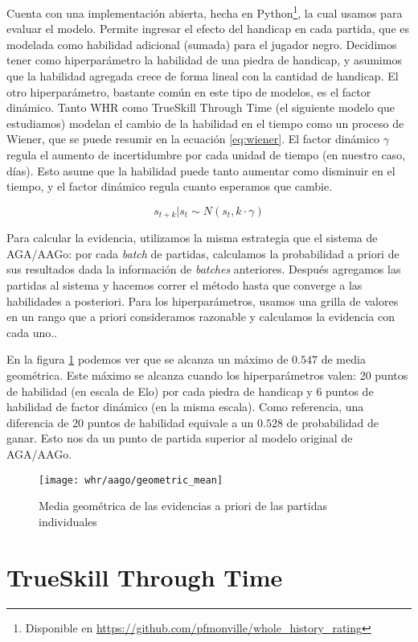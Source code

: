 \documentclass[a4paper,10pt]{report}
\begin{document}
Cuenta con una implementación abierta, hecha en Python\footnote{Disponible en \url{https://github.com/pfmonville/whole_history_rating}}, la cual usamos para evaluar el modelo.
Permite ingresar el efecto del handicap en cada partida, que es modelada como habilidad adicional (sumada) para el jugador negro.
Decidimos tener como hiperparámetro la habilidad de una piedra de handicap, y asumimos que la habilidad agregada crece de forma lineal con la cantidad de handicap.
El otro hiperparámetro, bastante común en este tipo de modelos, es el factor dinámico.
Tanto WHR como TrueSkill Through Time (el siguiente modelo que estudiamos) modelan el cambio de la habilidad en el tiempo como un proceso de Wiener, que se puede resumir en la ecuación \ref{eq:wiener}.
El factor dinámico $\gamma$ regula el aumento de incertidumbre por cada unidad de tiempo (en nuestro caso, días).
Esto asume que la habilidad puede tanto aumentar como disminuir en el tiempo, y el factor dinámico regula cuanto esperamos que cambie.

\begin{equation}\label{eq:wiener}
	s_{t+k} | s_t \sim N(s_t, k \cdot \gamma)
\end{equation}

Para calcular la evidencia, utilizamos la misma estrategia que el sistema de AGA/AAGo: por cada \textit{batch} de partidas, calculamos la probabilidad a priori de sus resultados dada la información de \textit{batches} anteriores. Después agregamos las partidas al sistema y hacemos correr el método hasta que converge a las habilidades a posteriori.
Para los hiperparámetros, usamos una grilla de valores en un rango que a priori consideramos razonable y calculamos la evidencia con cada uno..

En la figura \ref{fig:whr-evidence} podemos ver que se alcanza un máximo de $0.547$ de media geométrica. Este máximo se alcanza cuando los hiperparámetros valen: 20 puntos de habilidad (en escala de Elo) por cada piedra de handicap y 6 puntos de habilidad de factor dinámico (en la misma escala).
Como referencia, una diferencia de 20 puntos de habilidad equivale a un $0.528$ de probabilidad de ganar.
Esto nos da un punto de partida superior al modelo original de AGA/AAGo.

\begin{figure}
	\centering
	\texttt{[image: whr/aago/geometric\_mean]}
	\caption{Media geométrica de las evidencias a priori de las partidas individuales}
	\label{fig:whr-evidence}
\end{figure}


\section*{TrueSkill Through Time}


\end{document}
